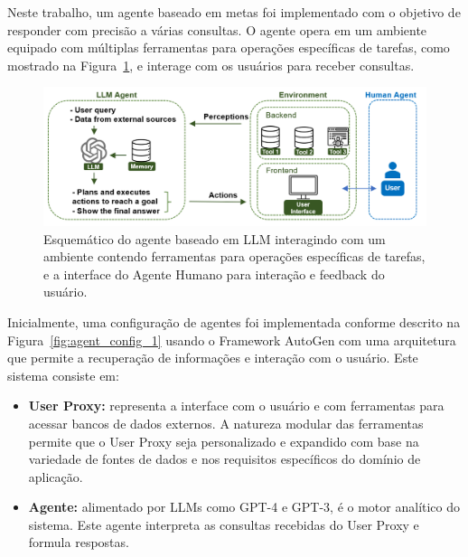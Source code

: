     
    
            Neste trabalho, um agente baseado em metas \cite{Russell2020} foi implementado com o objetivo de responder com precisão a várias consultas. O agente opera em um ambiente equipado com múltiplas ferramentas para operações específicas de tarefas, como mostrado na Figura~\ref{fig:agent_environment}, e interage com os usuários para receber consultas.
            
            \begin{figure}[ht]
                \centering
                \includegraphics[width=1\textwidth]{images/agent_environment_4.png}
                \caption{Esquemático do agente baseado em LLM interagindo com um ambiente contendo ferramentas para operações específicas de tarefas, e a interface do Agente Humano para interação e feedback do usuário.}
                \label{fig:agent_environment}
            \end{figure}           
            
            Inicialmente, uma configuração de agentes foi implementada conforme descrito na Figura~\ref{fig:agent_config_1} usando o Framework AutoGen \cite{Wu2023} com uma arquitetura que permite a recuperação de informações e interação com o usuário. Este sistema consiste em:
            
            \begin{itemize}        
            
                \item \textbf{User Proxy:} representa a interface com o usuário e com ferramentas para acessar bancos de dados externos. A natureza modular das ferramentas permite que o User Proxy seja personalizado e expandido com base na variedade de fontes de dados e nos requisitos específicos do domínio de aplicação.
            
                \item \textbf{Agente:} alimentado por LLMs como GPT-4 e GPT-3, é o motor analítico do sistema. Este agente interpreta as consultas recebidas do User Proxy e formula respostas.
                                         
            \end{itemize}
            
